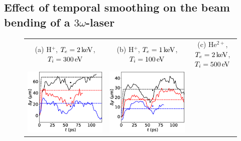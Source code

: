 \documentclass[%
 reprint,
 amsmath,amssymb,
 aps,
]{revtex4-1}
\begin{document}
\subsection{Effect of temporal smoothing on the beam bending of a  $3\omega$-laser}\label{sec:parax}
\begin{figure}
\begin{tabular}{ccc}
(a) H$^+$, $T_e=2\, \rm keV$,  $T_i=300\, \rm eV $ & (b) H$^+$, $T_e=1\, \rm keV$,  $T_i=100\, \rm eV $&(c) He$^{2+}$, $T_e=2\, \rm keV$, $T_i=500\, \rm eV $\\
\includegraphics[scale=0.32]{bbssd_H300.eps}&
\includegraphics[scale=0.32]{bbssd_H100.eps}&

\end{tabular}
\end{figure}
\end{document}
